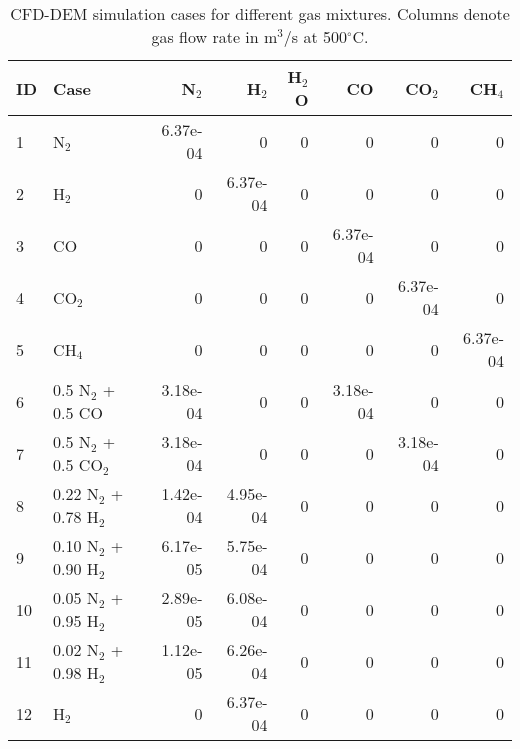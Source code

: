 
\begin{table}[H]
    \centering
    \caption{CFD-DEM simulation cases for different gas mixtures. Columns denote gas flow rate in m$^3$/s at 500$^\circ$C.}
    \begin{tabular}{llrrrrrr}
        \toprule
        ID & Case                    & N$_2$     & H$_2$    & H$_2$O   & CO       & CO$_2$    & CH$_4$   \\
        \midrule
        1  & N$_2$                   & 6.37e-04  & 0        & 0        & 0        & 0         & 0        \\
        2  & H$_2$                   & 0         & 6.37e-04 & 0        & 0        & 0         & 0        \\
        3  & CO                      & 0         & 0        & 0        & 6.37e-04 & 0         & 0        \\
        4  & CO$_2$                  & 0         & 0        & 0        & 0        & 6.37e-04  & 0        \\
        5  & CH$_4$                  & 0         & 0        & 0        & 0        & 0         & 6.37e-04 \\
        6  & 0.5 N$_2$ + 0.5 CO      & 3.18e-04  & 0        & 0        & 3.18e-04 & 0         & 0        \\
        7  & 0.5 N$_2$ + 0.5 CO$_2$  & 3.18e-04  & 0        & 0        & 0        & 3.18e-04  & 0        \\
        8  & 0.22 N$_2$ + 0.78 H$_2$ & 1.42e-04  & 4.95e-04 & 0        & 0        & 0         & 0        \\
        9  & 0.10 N$_2$ + 0.90 H$_2$ & 6.17e-05  & 5.75e-04 & 0        & 0        & 0         & 0        \\
        10 & 0.05 N$_2$ + 0.95 H$_2$ & 2.89e-05  & 6.08e-04 & 0        & 0        & 0         & 0        \\
        11 & 0.02 N$_2$ + 0.98 H$_2$ & 1.12e-05  & 6.26e-04 & 0        & 0        & 0         & 0        \\
        12 & H$_2$                   & 0         & 6.37e-04 & 0        & 0        & 0         & 0        \\
        \bottomrule
    \end{tabular}
    \label{tab:flowrates}
\end{table}
